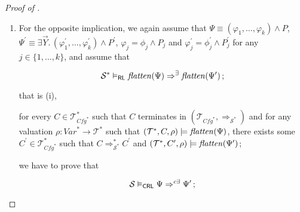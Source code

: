 \begin{proof}[Proof of ]
\begin{enumerate}
\begin{proofenv}
    \end{proofenv}
    Since we have constructed $C^\prime$ as a list of smaller configurations,
    it remains to be proven that
    \begin{proofenv}
        there exists a $\mathcal{T}$-valuation $\rho^\prime_0$
        satisfying $\rho^\prime_0(v) = \rho(v)$ for any $v \in \mathit{Var} \setminus \vec{Y}$
        such that for any $j \in \{ 1, \ldots, k \}$,
        $(\mathcal{T}, c^\prime_j, \rho^\prime_0) \modelsML \varphi^\prime_j \land P$.
    \end{proofenv}
    Let us choose $\rho^\prime_0$ defined by
    $\rho_0^\prime(v) = \rho_2(v)$ for any $v \in \mathit{Var}$.
    We verify that $\rho_0^\prime(v) = \rho_2(v) = \rho_1(v) = \rho_0(v) = \rho(v)$
    for any $v \in \mathit{Var} \setminus \vec{Y}$,
    and the rest follows from the assumption (iii) by .
    This concludes the proof of the first implication.
    \item For the opposite implication, 
    we again assume that $\Psi \equiv (\varphi_1,\ldots,\varphi_k) \land P$,
    $\Psi^\prime \equiv \exists \vec{Y}.\, (\varphi_1^\prime,\ldots,\varphi_k^\prime) \land P^\prime$,
    $\varphi_j = \phi_j \land P_j$ and $\varphi^\prime_j = \phi^\prime_j \land P^\prime_j$ for any $j \in \{ 1, \ldots, k \}$,
    and assume that
    \begin{proofenv}
        \begin{equation*}
            \mathcal{S}^* \vDash_{\mathsf{RL}} \mathit{flatten}(\Psi) \Rightarrow^\exists \mathit{flatten}(\Psi^\prime) \, ;
        \end{equation*}
    \end{proofenv}
    that is (i),
    \begin{proofenv}
        for every $C \in \mathcal{T}^*_{\mathit{Cfg}^*}$ such that $C$ terminates in
        $(\mathcal{T}_{\mathit{Cfg}^*}, \Rightarrow_{\mathcal{S}^*})$
        and for any valuation $\rho : \mathit{Var}^* \to \mathcal{T}^*$ such that
        $(\mathcal{T}^*, C, \rho) \models \mathit{flatten}(\Psi)$,
        there exists some $C^\prime \in \mathcal{T}^*_{\mathit{Cfg}^*}$ such that
        $C \Rightarrow_{\mathcal{S}^*}^* C^\prime$
        and $(\mathcal{T}^*, C^\prime, \rho) \models \mathit{flatten}(\Psi^\prime)$;
    \end{proofenv}
    we have to prove that
    \begin{proofenv}
        \begin{equation*}
            \mathcal{S} \modelsCRL \Psi \Rightarrow^{c\exists} \Psi^\prime \, ;

\end{equation*}
\end{proofenv}
\end{enumerate}
\end{proof}
